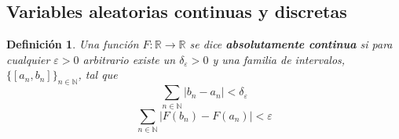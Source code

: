 \documentclass[12pt,letterpaper]{book}
\newtheorem{definicion}{Definición}[chapter]
\newcommand{\R}{\mathbb{R}}
\newcommand{\N}{\mathbb{N}}
\newcommand{\abso}[1]{\left| #1 \right|}
\begin{document}
%
%


\subsection{Variables aleatorias continuas y discretas}

\begin{definicion}
Una función $F: \R \rightarrow \R$ se dice \textbf{absolutamente continua} si para cualquier $\varepsilon>0$ arbitrario existe un $\delta_\varepsilon>0$ y una familia de intervalos, $\{ [a_n, b_n]\}_{n\in \N}$, tal que
\begin{equation}
\sum_{n\in \N} \abso{b_n - a_n} < \delta_\varepsilon
\end{equation}
\begin{equation}
\sum_{n\in \N} \abso{F(b_n) - F(a_n)} < \varepsilon 
\end{equation}
\end{definicion}
\end{document}
